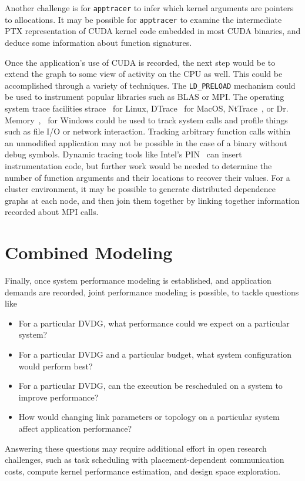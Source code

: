 Another challenge is for \texttt{apptracer} to infer which kernel arguments are pointers to allocations.
It may be possible for \texttt{apptracer} to examine the intermediate PTX representation of CUDA kernel code embedded in most CUDA binaries, and deduce some information about function signatures.

Once the application's use of CUDA is recorded, the next step would be to extend the graph to some view of activity on the CPU as well.
This could be accomplished through a variety of techniques.
The \texttt{LD\_PRELOAD} mechanism could be used to instrument popular libraries such as BLAS or MPI.
The operating system trace facilities strace~\cite{strace2018} for Linux, DTrace~\cite{dtrace2008} for MacOS, NtTrace~\cite{orr2014nttrace}, or Dr. Memory~\cite{bruening2001design},~\cite{drmemory2018} for Windows could be used to track system calls and profile things such as file I/O or network interaction.
Tracking arbitrary function calls within an unmodified application may not be possible in the case of a binary without debug symbols.
Dynamic tracing tools like Intel's PIN~\cite{intel2012pin} can insert instrumentation code, but further work would be needed to determine the number of function arguments and their locations to recover their values.
For a cluster environment, it may be possible to generate distributed dependence graphs at each node, and then join them together by linking together information recorded about MPI calls.

\section{Combined Modeling}
\label{sec:modeling}

Finally, once system performance modeling is established, and application demands are recorded, joint performance modeling is possible, to tackle questions like
\begin{itemize}
    \item For a particular DVDG, what performance could we expect on a particular system?
    \item For a particular DVDG and a particular budget, what system configuration would perform best?
    \item For a particular DVDG, can the execution be rescheduled on a system to improve performance?
    \item How would changing link parameters or topology on a particular system affect application performance?
\end{itemize}
Answering these questions may require additional effort in open research challenges, such as task scheduling with placement-dependent communication costs, compute kernel performance estimation, and design space exploration.
